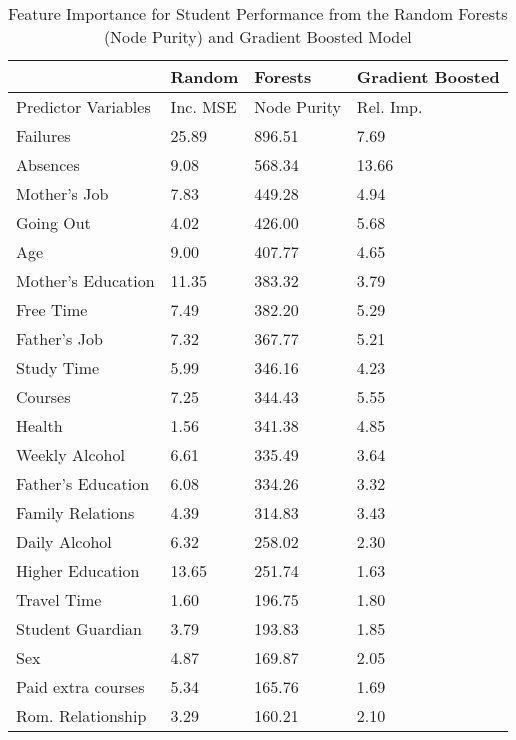 \documentclass[sigconf]{acmart}
\begin{document}

\begin{table}
  \caption{Feature Importance for Student Performance from the Random Forests 
  (Node Purity) and Gradient Boosted Model}
  \label{tab:freq}
  \begin{tabular}{llll}
    \toprule
            & Random & Forests & Gradient Boosted \\    
    \midrule   
    
    Predictor Variables & Inc. MSE & Node Purity & Rel. Imp. \\    
    \midrule
    Failures            & 25.89 & 896.51 &  7.69 \\    
    Absences            &  9.08 & 568.34 & 13.66 \\
    Mother's Job        &  7.83 & 449.28 &  4.94 \\   
    Going Out           &  4.02 & 426.00 &  5.68 \\
    Age                 &  9.00 & 407.77 &  4.65 \\
    Mother's Education  & 11.35 & 383.32 &  3.79 \\
    Free Time           &  7.49 & 382.20 &  5.29 \\
    Father's Job        &  7.32 & 367.77 &  5.21 \\       
    Study Time          &  5.99 & 346.16 &  4.23 \\       
    Courses             &  7.25 & 344.43 &  5.55 \\ 
    Health              &  1.56 & 341.38 &  4.85 \\ 
    Weekly Alcohol      &  6.61 & 335.49 &  3.64 \\
    Father's Education  &  6.08 & 334.26 &  3.32 \\    
    Family Relations    &  4.39 & 314.83 &  3.43 \\    
    Daily Alcohol       &  6.32 & 258.02 &  2.30 \\
    Higher Education    & 13.65 & 251.74 &  1.63 \\   
    Travel Time         &  1.60 & 196.75 &  1.80 \\       
    Student Guardian    &  3.79 & 193.83 &  1.85 \\
    Sex                 &  4.87 & 169.87 &  2.05 \\
    Paid extra courses  &  5.34 & 165.76 &  1.69 \\
    Rom. Relationship   &  3.29 & 160.21 &  2.10 \\

\end{tabular}
\end{table}
\end{document}
